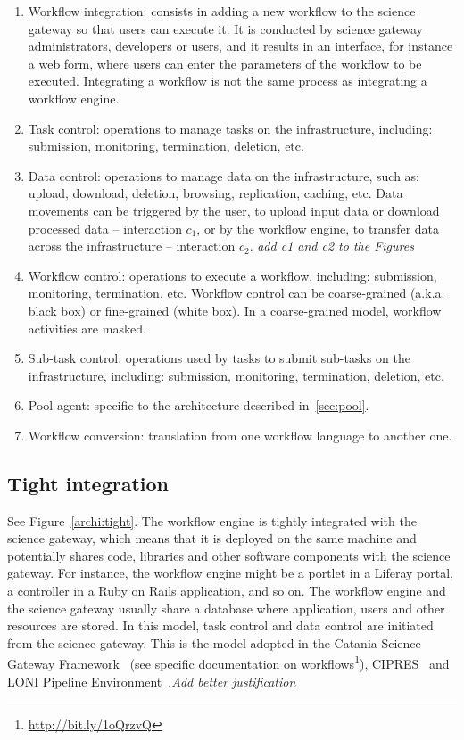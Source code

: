 \documentclass[preprint,3p,twocolumn]{elsarticle}
\newcommand{\todo}[1]{\color{blue}\xspace\emph{#1}\xspace\color{black}}
\begin{document}
\begin{enumerate}[leftmargin=0cm,itemindent=0.6cm,label=\texttt{(\alph*)}]

\item Workflow integration: consists in adding a new workflow to the
  science gateway so that users can execute it. It is conducted by
  science gateway administrators, developers or users, and it results
  in an interface, for instance a web form, where users can enter the
  parameters of the workflow to be executed. Integrating a workflow is
  not the same process as integrating a workflow engine.
\item Task control: operations to manage tasks on the infrastructure,
  including: submission, monitoring, termination, deletion, etc.
\item Data control: operations to manage data on
  the infrastructure, such as: upload, download, deletion, browsing,
  replication, caching, etc. Data movements can be triggered by the
  user, to upload input data or download processed data -- interaction
  \texttt{$c_1$}, or by the workflow engine, to transfer data across the
  infrastructure -- interaction \texttt{$c_2$}. \todo{add c1 and c2 to the
    Figures}
\item Workflow control: operations to execute a workflow, including:
  submission, monitoring, termination, etc. Workflow control can be
  coarse-grained (a.k.a. black box) or fine-grained (white box). In a
  coarse-grained model, workflow activities are masked. 
\item Sub-task control: operations used by tasks to submit sub-tasks
  on the infrastructure, including: submission, monitoring,
  termination, deletion, etc.
\item Pool-agent: specific to the architecture described in~\ref{sec:pool}.
\item Workflow conversion: translation from one workflow language to
  another one.
\end{enumerate}

\subsection{Tight integration}

See Figure~\ref{archi:tight}. The workflow engine is tightly
integrated with the science gateway, which means that it is deployed
on the same machine and potentially shares code, libraries and other
software components with the science gateway. For instance, the
workflow engine might be a portlet in a Liferay portal, a controller
in a Ruby on Rails application, and so on. The workflow engine and the
science gateway usually share a database where application, users and
other resources are stored. In this model, task control and data
control are initiated from the science gateway. This is the model
adopted in the Catania Science Gateway Framework~\cite{Ardizzone2012}
(see specific documentation on
workflows\footnote{\url{http://bit.ly/1oQrzvQ}}),
CIPRES~\cite{miller2010creating} and LONI Pipeline
Environment~\cite{dinov2009efficient}.\todo{Add better justification}
\end{document}
